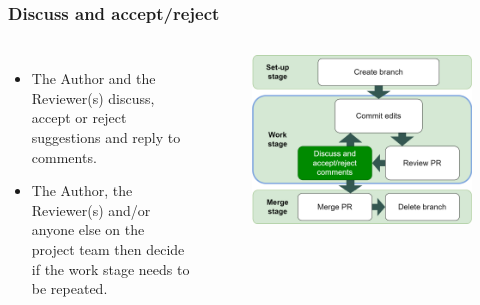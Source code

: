 \documentclass[aspectratio=169]{beamer}
\begin{document}
\begin{frame}
	\frametitle{Discuss and accept/reject}
	\begin{columns}[c]

		\begin{itemize}
			\setlength\itemsep{1em}
			\item The Author and the Reviewer(s) discuss, accept or reject suggestions
			and reply to comments.
			\item The Author, the Reviewer(s)
			and/or anyone else on the project team then
			decide if the work stage needs to be repeated.
		\end{itemize}

		\vspace{-.4cm}
		\begin{figure}
			\centering
			\includegraphics[width=\textwidth]{./img/branch-pr-merge-cycle-S2c.png}
		\end{figure}

	\end{columns}
\end{frame}
\end{document}
